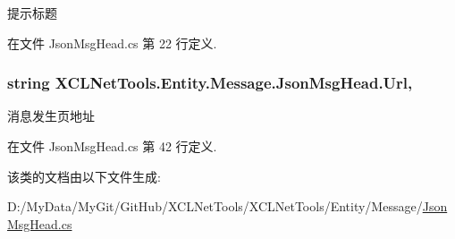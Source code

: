 提示标题 



在文件 Json\-Msg\-Head.\-cs 第 22 行定义.

\hypertarget{class_x_c_l_net_tools_1_1_entity_1_1_message_1_1_json_msg_head_a30c01b95d9a0854dec4af920541f3320}{
\subsubsection[{Url}]{\setlength{\rightskip}{0pt plus 5cm}string X\-C\-L\-Net\-Tools.\-Entity.\-Message.\-Json\-Msg\-Head.\-Url\hspace{0.3cm}{\ttfamily [get]}, {\ttfamily [set]}}}\label{class_x_c_l_net_tools_1_1_entity_1_1_message_1_1_json_msg_head_a30c01b95d9a0854dec4af920541f3320}


消息发生页地址 



在文件 Json\-Msg\-Head.\-cs 第 42 行定义.



该类的文档由以下文件生成\-:\begin{DoxyCompactItemize}
\item 
D\-:/\-My\-Data/\-My\-Git/\-Git\-Hub/\-X\-C\-L\-Net\-Tools/\-X\-C\-L\-Net\-Tools/\-Entity/\-Message/\hyperlink{_json_msg_head_8cs}{Json\-Msg\-Head.\-cs}\end{DoxyCompactItemize}
